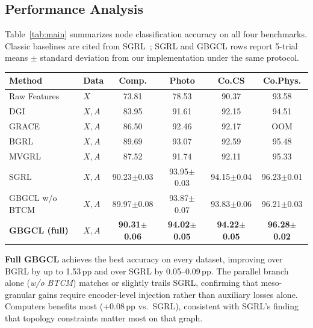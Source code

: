 \documentclass[conference]{IEEEtran}
\begin{document}
\subsection{Performance Analysis}
Table~\ref{tab:main} summarizes node classification accuracy on all four benchmarks.
Classic baselines are cited from SGRL~\cite{he2024sgrl}; SGRL and GBGCL rows report 5-trial means $\pm$ standard deviation from our implementation under the same protocol.
\begin{strip}
  \centering
  \footnotesize
  \setlength{\tabcolsep}{3pt}
  \label{tab:main}
  \begin{tabular}{llcccc}
    \toprule
    Method & Data & Comp. & Photo & Co.CS & Co.Phys. \\
    \midrule
    Raw Features & $X$ & 73.81 & 78.53 & 90.37 & 93.58 \\
    DGI & $X,A$ & 83.95 & 91.61 & 92.15 & 94.51 \\
    GRACE & $X,A$ & 86.50 & 92.46 & 92.17 & OOM \\
    BGRL~\cite{thakoor2021bgrl} & $X,A$ & 89.69 & 93.07 & 92.59 & 95.48 \\
    MVGRL & $X,A$ & 87.52 & 91.74 & 92.11 & 95.33 \\
    \midrule
    SGRL~\cite{he2024sgrl} & $X,A$ & 90.23{\scriptsize$\pm$0.03} & 93.95{\scriptsize$\pm$0.03} & 94.15{\scriptsize$\pm$0.04} & 96.23{\scriptsize$\pm$0.01} \\
    GBGCL w/o BTCM & $X,A$ & 89.97{\scriptsize$\pm$0.08} & 93.87{\scriptsize$\pm$0.07} & 93.83{\scriptsize$\pm$0.06} & 96.21{\scriptsize$\pm$0.03} \\
    \textbf{GBGCL (full)} & $X,A$ & \textbf{90.31{\scriptsize$\pm$0.06}} & \textbf{94.02{\scriptsize$\pm$0.05}} & \textbf{94.22{\scriptsize$\pm$0.05}} & \textbf{96.28{\scriptsize$\pm$0.02}} \\
    \bottomrule
  \end{tabular}
\end{strip}

\textbf{Full GBGCL} achieves the best accuracy on every dataset, improving over BGRL by up to 1.53\,pp and over SGRL by 0.05--0.09\,pp.
The parallel branch alone (\emph{w/o BTCM}) matches or slightly trails SGRL, confirming that meso-granular gains require encoder-level injection rather than auxiliary losses alone.
Computers benefits most (+0.08\,pp vs.\ SGRL), consistent with SGRL's finding that topology constraints matter most on that graph.
\end{document}
